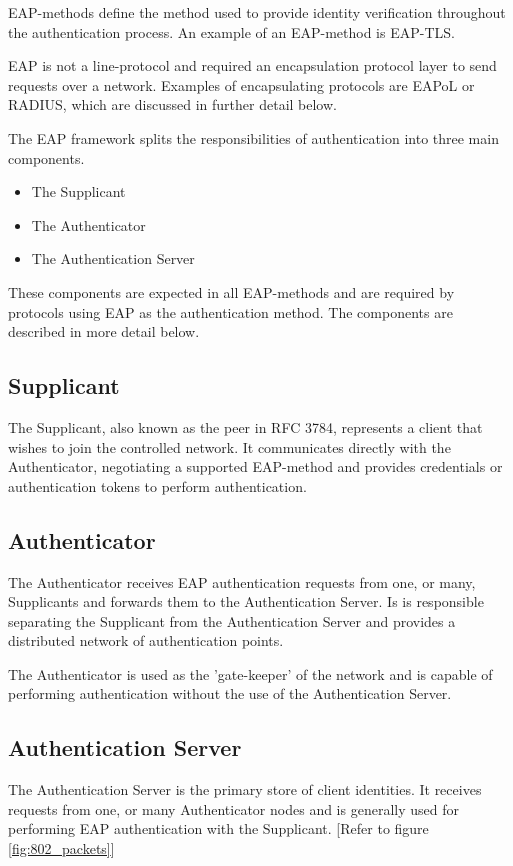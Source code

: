 EAP-methods define the method used to provide identity verification throughout the authentication process. An example of an EAP-method is EAP-TLS. 

EAP is not a line-protocol and required an encapsulation protocol layer to send requests over a network. Examples of encapsulating protocols are EAPoL or RADIUS, which are discussed in further detail below.

The EAP framework splits the responsibilities of authentication into three main components. 
\begin{itemize}
    \item The Supplicant
    \item The Authenticator
    \item The Authentication Server
\end{itemize}
These components are expected in all EAP-methods and are required by protocols using EAP as the authentication method. The components are described in more detail below.

\subsection{Supplicant}
The Supplicant, also known as the peer in RFC 3784\cite{rfc_3748}, represents a client that wishes to join the controlled network. It communicates directly with the Authenticator, negotiating a supported EAP-method and provides credentials or authentication tokens to perform authentication.

\subsection{Authenticator}
The Authenticator receives EAP authentication requests from one, or many, Supplicants and forwards them to the Authentication Server. Is is responsible separating the Supplicant from the Authentication Server and provides a distributed network of authentication points. 

The Authenticator is used as the 'gate-keeper' of the network and is capable of performing authentication without the use of the Authentication Server.

\subsection{Authentication Server}
The Authentication Server is the primary store of client identities. It receives requests from one, or many Authenticator nodes and is generally used for performing EAP authentication with the Supplicant. [Refer to figure \ref{fig:802_packets}]


